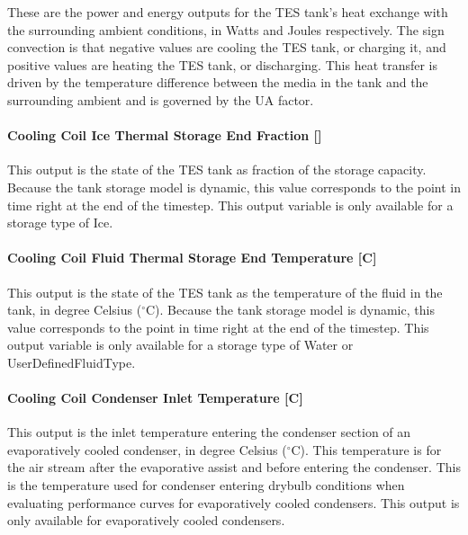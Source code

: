 These are the power and energy outputs for the TES tank's heat exchange with the surrounding ambient conditions, in Watts and Joules respectively. The sign convection is that negative values are cooling the TES tank, or charging it, and positive values are heating the TES tank, or discharging. This heat transfer is driven by the temperature difference between the media in the tank and the surrounding ambient and is governed by the UA factor.

\paragraph{Cooling Coil Ice Thermal Storage End Fraction {[]}}\label{cooling-coil-ice-thermal-storage-end-fraction}

This output is the state of the TES tank as fraction of the storage capacity. Because the tank storage model is dynamic, this value corresponds to the point in time right at the end of the timestep. This output variable is only available for a storage type of Ice.

\paragraph{Cooling Coil Fluid Thermal Storage End Temperature {[}C{]}}\label{cooling-coil-fluid-thermal-storage-end-temperature-c}

This output is the state of the TES tank as the temperature of the fluid in the tank, in degree Celsius ($^\circ$C). Because the tank storage model is dynamic, this value corresponds to the point in time right at the end of the timestep. This output variable is only available for a storage type of Water or UserDefinedFluidType.

\paragraph{Cooling Coil Condenser Inlet Temperature {[}C{]}}\label{cooling-coil-condenser-inlet-temperature-c-2}

This output is the inlet temperature entering the condenser section of an evaporatively cooled condenser, in degree Celsius ($^\circ$C). This temperature is for the air stream after the evaporative assist and before entering the condenser. This is the temperature used for condenser entering drybulb conditions when evaluating performance curves for evaporatively cooled condensers. This output is only available for evaporatively cooled condensers.

